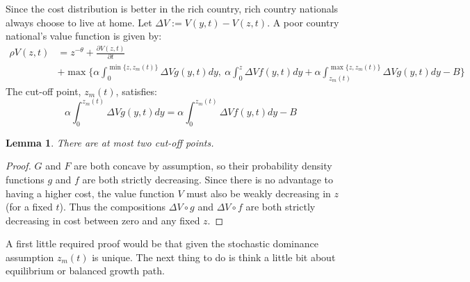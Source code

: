 \documentclass{article}
\newtheorem{lemma}[theorem]{Lemma}
\begin{document}
Since the cost distribution is better in the rich country, rich country nationals always choose to live at home.  Let $\Delta V := V(y,t)-V(z,t)$. A poor country national's value function is given by:  
\begin{align}
  \rho V(z,t) &= z^{-\theta} + \frac{\partial V(z,t)}{\partial t} \nonumber  \\
  &+ \max\{\alpha \int_0^{\min \{z,z_m(t)\}} \Delta V g(y,t) dy,\  \alpha \int_0^z \Delta V f(y,t) dy + \alpha \int_{z_m(t)}^{\max \{z,z_m(t)\}}\Delta V g(y,t)dy - B\}
\end{align}
The cut-off point, $z_m(t)$, satisfies:
\begin{equation}
  \alpha \int_0^{z_m(t)} \Delta V g(y,t) dy = \alpha \int_0^{z_m(t)} \Delta V f(y,t)dy - B
\end{equation}
\begin{lemma}
 There are at most two cut-off points. 
\end{lemma}
\begin{proof}
$G$ and $F$ are both concave by assumption, so their probability density functions $g$ and $f$ are both strictly decreasing.  
Since there is no advantage to having a higher cost, the value function $V$ must also be weakly decreasing in $z$ (for a fixed $t$).   
Thus the compositions $\Delta V \circ g$ and $\Delta V \circ f$ are both strictly decreasing in cost between zero and any fixed $z$.


\end{proof}
A first little required proof would be that given the stochastic dominance assumption $z_m(t)$ is unique.
The next thing to do is think a little bit about equilibrium or balanced growth path.
\end{document}

